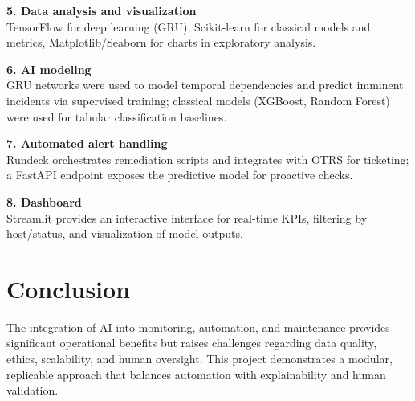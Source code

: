 \documentclass[12pt,a4paper]{article}
\begin{document}
\textbf{5. Data analysis and visualization}\\
TensorFlow for deep learning (GRU), Scikit-learn for classical models and metrics, Matplotlib/Seaborn for charts in exploratory analysis.

\textbf{6. AI modeling}\\
GRU networks were used to model temporal dependencies and predict imminent incidents via supervised training; classical models (XGBoost, Random Forest) were used for tabular classification baselines.

\textbf{7. Automated alert handling}\\
Rundeck orchestrates remediation scripts and integrates with OTRS for ticketing; a FastAPI endpoint exposes the predictive model for proactive checks.

\textbf{8. Dashboard}\\
Streamlit provides an interactive interface for real-time KPIs, filtering by host/status, and visualization of model outputs.

\section*{Conclusion}
The integration of AI into monitoring, automation, and maintenance provides significant operational benefits but raises challenges regarding data quality, ethics, scalability, and human oversight. This project demonstrates a modular, replicable approach that balances automation with explainability and human validation.



\end{document}
